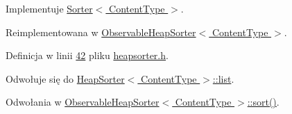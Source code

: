 Implementuje \hyperlink{class_sorter_a880cfd8969b78557ed207ad6f2bd4819}{Sorter$<$ Content\-Type $>$}.



Reimplementowana w \hyperlink{class_observable_heap_sorter_aa56ec2ca7bd6498f0a0085946c464f36}{Observable\-Heap\-Sorter$<$ Content\-Type $>$}.



Definicja w linii \hyperlink{heapsorter_8h_source_l00042}{42} pliku \hyperlink{heapsorter_8h_source}{heapsorter.\-h}.



Odwołuje się do \hyperlink{heapsorter_8h_source_l00021}{Heap\-Sorter$<$ Content\-Type $>$\-::list}.



Odwołania w \hyperlink{observableheapsorter_8h_source_l00026}{Observable\-Heap\-Sorter$<$ Content\-Type $>$\-::sort()}.


